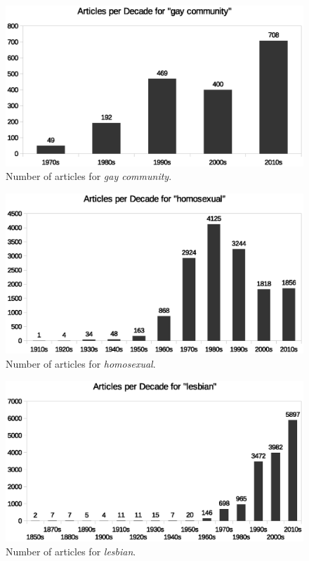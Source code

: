 \documentclass[10pt,a4paper,twocolumn]{scrartcl}
\begin{document}
\begin{figure}
\includegraphics[width=\columnwidth]{figures/gayCommunity_decade}
\caption{Number of articles for \textit{gay community}.} \label{fig:gayCommunity}
\end{figure}

\begin{figure}
\includegraphics[width=\columnwidth]{figures/homosexual_decade}
\caption{Number of articles for \textit{homosexual}.} \label{fig:homosexual}
\end{figure}

\begin{figure}
\includegraphics[width=\columnwidth]{figures/lesbian_decade}
\caption{Number of articles for \textit{lesbian}.} \label{fig:lesbian}
\end{figure}
\end{document}

